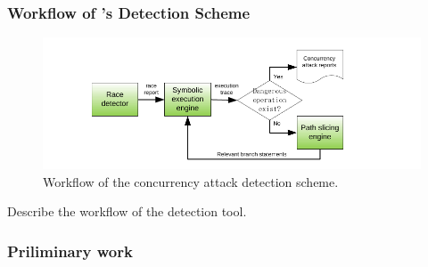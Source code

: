\subsubsection{Workflow of \xxx's Detection Scheme}\label{sec:detect-arch}

\begin{figure}[t]
\centering
\includegraphics[width=0.5\columnwidth]{figures/detection}
\vspace{-.05in}
\caption{{Workflow of the concurrency attack detection scheme.}} 
\label{fig:detection}
\vspace{-.05in}
\end{figure}

Describe the workflow of the detection tool.





 

\subsubsection{Priliminary work}\label{sec:detect-result}



